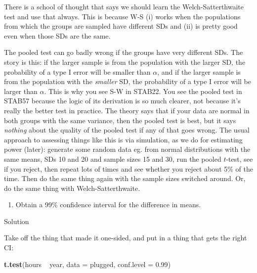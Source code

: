 \documentclass[]{tufte-book}
\newenvironment{Shaded}{}{}
\newcommand{\DataTypeTok}[1]{\textcolor[rgb]{0.56,0.13,0.00}{#1}}
\newcommand{\FloatTok}[1]{\textcolor[rgb]{0.25,0.63,0.44}{#1}}
\newcommand{\KeywordTok}[1]{\textcolor[rgb]{0.00,0.44,0.13}{\textbf{#1}}}
\newcommand{\NormalTok}[1]{#1}
\newcommand{\OperatorTok}[1]{\textcolor[rgb]{0.40,0.40,0.40}{#1}}
\newcommand{\StringTok}[1]{\textcolor[rgb]{0.25,0.44,0.63}{#1}}
\providecommand{\tightlist}{%
  \setlength{\itemsep}{0pt}\setlength{\parskip}{0pt}}
\theoremstyle{definition}
\theoremstyle{definition}
\theoremstyle{definition}
\theoremstyle{remark}
\begin{document}
There is a school of thought that says we should learn the
Welch-Satterthwaite test and use that always. This is because W-S (i)
works when the populations from which the groups are sampled have
different SDs and (ii) is pretty good even when those SDs are the same.

The pooled test can go badly wrong if the groups have very different
SDs. The story is this: if the larger sample is from the population with
the larger SD, the probability of a type I error will be smaller than
\(\alpha\), and if the larger sample is from the population with the
\emph{smaller} SD, the probability of a type I error will be larger than
\(\alpha\). This is why you see S-W in STAB22. You see the pooled test
in STAB57 because the logic of its derivation is so much clearer,
not because it's really the better test in practice. The theory says
that if your data are normal in both groups with the same variance, then
the pooled test is best, but it says \emph{nothing} about the quality of
the pooled test if any of that goes wrong. The usual approach to
assessing things like this is via simulation, as we do for estimating
power (later): generate some random data eg. from normal distributions
with the same means, SDs 10 and 20 and sample sizes 15 and 30, run the
pooled \(t\)-test, see if you reject, then repeat lots of times and see
whether you reject about 5\% of the time. Then do the same thing again
with the sample sizes switched around. Or, do the same thing with
Welch-Satterthwaite.

\begin{enumerate}
\def\labelenumi{(\alph{enumi})}
\setcounter{enumi}{3}
\tightlist
\item
  Obtain a 99\% confidence interval for the difference in means.
\end{enumerate}

Solution

Take off the thing that made it one-sided, and put in a thing that gets
the right CI:

\begin{Shaded}
\begin{Highlighting}[]
\KeywordTok{t.test}\NormalTok{(hours }\OperatorTok{~}\StringTok{ }\NormalTok{year, }\DataTypeTok{data =}\NormalTok{ plugged, }\DataTypeTok{conf.level =} \FloatTok{0.99}\NormalTok{)}
\end{Highlighting}
\end{Shaded}
\end{document}
